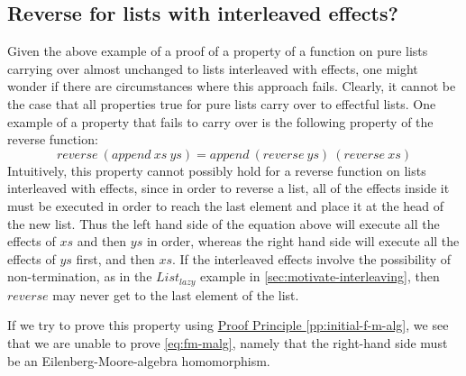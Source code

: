\documentclass{jfp1}
\newcommand{\proofprinref}[1]{\hyperref[#1]{Proof Principle \ref*{#1}}}
\begin{document}
\subsection{Reverse for lists with interleaved effects?}
\label{sec:reverse}

Given the above example of a proof of a property of a function on pure
lists carrying over almost unchanged to lists interleaved with
effects, one might wonder if there are circumstances where this
approach fails. Clearly, it cannot be the case that all properties
true for pure lists carry over to effectful lists. One example of a
property that fails to carry over is the following property of the
reverse function:
\begin{equation}\label{eq:reverse-append}
  \mathit{reverse}~(\mathit{append}~\mathit{xs}~\mathit{ys}) = \mathit{append}~(\mathit{reverse}~\mathit{ys})~(\mathit{reverse}~\mathit{xs})
\end{equation}
Intuitively, this property cannot possibly hold for a reverse function
on lists interleaved with effects, since in order to reverse a list,
all of the effects inside it must be executed in order to reach the
last element and place it at the head of the new list. Thus the left
hand side of the equation above will execute all the effects of
$\mathit{xs}$ and then $\mathit{ys}$ in order, whereas the right hand
side will execute all the effects of $\mathit{ys}$ first, and then
$\mathit{xs}$. If the interleaved effects involve the possibility of
non-termination, as in the $\mathit{List_{lazy}}$ example in
\autoref{sec:motivate-interleaving}, then $\mathit{reverse}$ may never
get to the last element of the list.

If we try to prove this property using
\proofprinref{pp:initial-f-m-alg}, we see that we are unable to prove
\autoref{eq:fm-malg}, namely that the right-hand side must be an
Eilenberg-Moore-algebra homomorphism.
\end{document}

